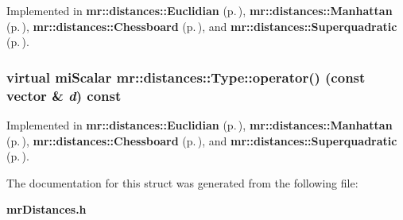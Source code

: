 Implemented in {\bf mr::distances::Euclidian} {\rm (p.\,\pageref{structmr_1_1distances_1_1Euclidian_a1})}, {\bf mr::distances::Manhattan} {\rm (p.\,\pageref{structmr_1_1distances_1_1Manhattan_a1})}, {\bf mr::distances::Chessboard} {\rm (p.\,\pageref{structmr_1_1distances_1_1Chessboard_a1})}, and {\bf mr::distances::Superquadratic} {\rm (p.\,\pageref{structmr_1_1distances_1_1Superquadratic_a1})}.
\subsubsection{\setlength{\rightskip}{0pt plus 5cm}virtual mi\-Scalar mr::distances::Type::operator() (const {\bf vector} \& {\em d}) const\hspace{0.3cm}{\tt  [pure virtual]}}\label{structmr_1_1distances_1_1Type_a0}




Implemented in {\bf mr::distances::Euclidian} {\rm (p.\,\pageref{structmr_1_1distances_1_1Euclidian_a0})}, {\bf mr::distances::Manhattan} {\rm (p.\,\pageref{structmr_1_1distances_1_1Manhattan_a0})}, {\bf mr::distances::Chessboard} {\rm (p.\,\pageref{structmr_1_1distances_1_1Chessboard_a0})}, and {\bf mr::distances::Superquadratic} {\rm (p.\,\pageref{structmr_1_1distances_1_1Superquadratic_a0})}.

The documentation for this struct was generated from the following file:\begin{CompactItemize}
\item 
{\bf mr\-Distances.h}\end{CompactItemize}

